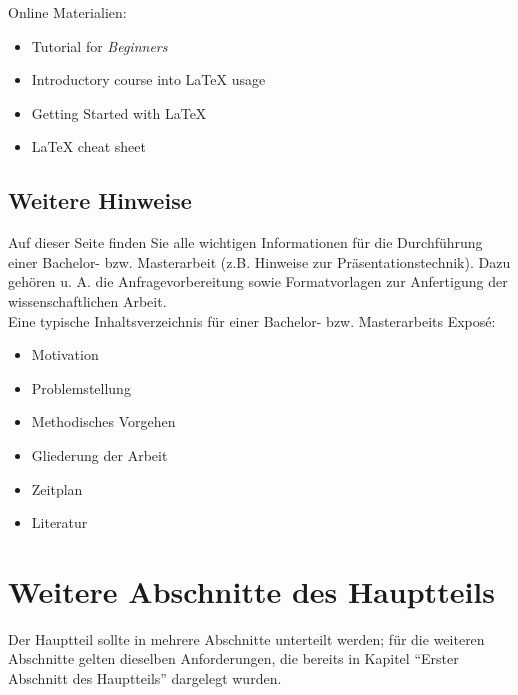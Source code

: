 \documentclass[11pt]{scrartcl}
\newcommand{\href}[2]{#2}
\begin{document}
Online Materialien:

\begin{itemize}
	\item \href{http://www.latex-tutorial.com/tutorials/beginners/}{Tutorial for \textit{Beginners}}
	\item \href{https://github.com/vdmitriyev/latex-intro}{Introductory course into LaTeX usage}
	\item \href{http://www.math.uiuc.edu/~hildebr/tex/latex-start.html}{Getting Started with LaTeX}
	\item \href{http://wch.github.io/latexsheet/}{LaTeX cheat sheet}
\end{itemize}				

\subsection{Weitere Hinweise}
Auf dieser \href{https://www.uni-oldenburg.de/informatik/vlba/lehre/hinweise-und-vorlagen/}{Seite} finden Sie alle wichtigen Informationen für die Durchführung einer Bachelor- bzw. Masterarbeit (z.B. \href{https://www.uni-oldenburg.de/fileadmin/user_upload/informatik/ag/vlba/download/Praesentationstechnik.pdf}{Hinweise zur Präsentationstechnik}). Dazu gehören u. A. die Anfragevorbereitung sowie Formatvorlagen zur Anfertigung der wissenschaftlichen Arbeit.\\


Eine typische Inhaltsverzeichnis für einer Bachelor- bzw. Masterarbeits Exposé:

\begin{itemize}
	\item Motivation
	\item Problemstellung
	\item Methodisches Vorgehen
	\item Gliederung der Arbeit
	\item Zeitplan
	\item Literatur
\end{itemize}

\section{Weitere Abschnitte des Hauptteils}
Der Hauptteil sollte in mehrere Abschnitte unterteilt werden; für die weiteren Abschnitte gelten dieselben Anforderungen, die bereits in Kapitel "`Erster Abschnitt des Hauptteils"' dargelegt wurden.
\end{document}
